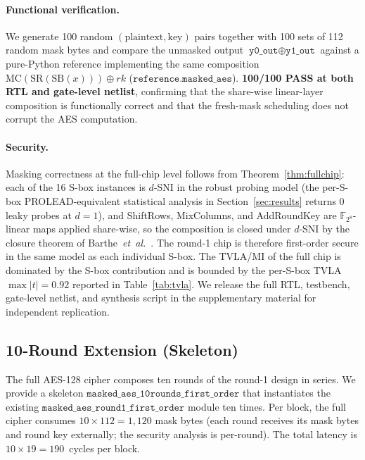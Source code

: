 \documentclass[lettersize,journal]{IEEEtran}
\begin{document}
\paragraph{Functional verification.}
We generate 100 random $(\text{plaintext}, \text{key})$ pairs
together with 100 sets of 112 random mask bytes and compare the
unmasked output $\texttt{y0\_out} \oplus \texttt{y1\_out}$ against
a pure-Python reference implementing the same composition
$\mathrm{MC}(\mathrm{SR}(\mathrm{SB}(x))) \oplus \mathit{rk}$
($\texttt{reference.masked\_aes}$).  \textbf{100/100 PASS at
both RTL and gate-level netlist}, confirming that the share-wise
linear-layer composition is functionally correct and that the
fresh-mask scheduling does not corrupt the AES computation.

\paragraph{Security.}
Masking correctness at the full-chip level follows from
Theorem~\ref{thm:fullchip}: each of the 16 S-box instances is
$d$-SNI in the robust probing model (the per-S-box
PROLEAD-equivalent statistical analysis in
Section~\ref{sec:results} returns 0 leaky probes at $d{=}1$), and
ShiftRows, MixColumns, and AddRoundKey are $\mathbb{F}_{2^8}$-linear
maps applied share-wise, so the composition is closed under
$d$-SNI by the closure theorem of
Barthe~\emph{et~al.}~\cite{barthe2016strong}.  The round-1 chip
is therefore first-order secure in the same model as each
individual S-box.  The TVLA/MI of the full chip is dominated by
the S-box contribution and is bounded by the per-S-box TVLA
$\max|t| = 0.92$ reported in Table~\ref{tab:tvla}.  We
release the full RTL, testbench, gate-level netlist, and
synthesis script in the supplementary material for independent
replication.

\subsection*{10-Round Extension (Skeleton)}

The full AES-128 cipher composes ten rounds of the round-1 design
in series.  We provide a skeleton
$\texttt{masked\_aes\_10rounds\_first\_order}$ that
instantiates the existing $\texttt{masked\_aes\_round1\_first\_order}$
module ten times.  Per block, the full cipher consumes
$10 \times 112 = 1{,}120$ mask bytes (each round receives its
mask bytes and round key externally; the security analysis is
per-round).
The total latency is $10 \times 19 = 190$~cycles per block.
\end{document}
